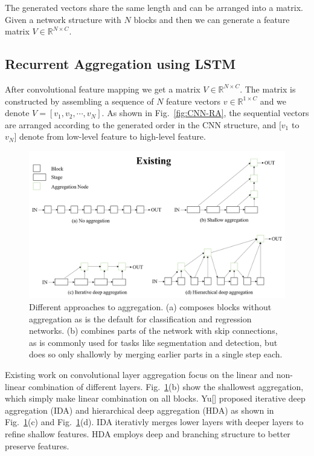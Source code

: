 \documentclass[runningheads]{llncs}
\begin{document}
The generated vectors share the same length and can be arranged into a matrix. Given a network structure with $N$ blocks and then we can generate a feature matrix $V\in \mathbb{R}^{N\times C}$.

\subsection{Recurrent Aggregation using LSTM}
After convolutional feature mapping we get a matrix $V\in \mathbb{R}^{N\times C}$. The matrix is constructed by assembling a sequence of $N$ feature vectors $v \in \mathbb{R}^{1\times C}$ and we denote $V=[v_1, v_2, \cdots, v_N]$. As shown in Fig.~\ref{fig:CNN-RA}, the sequential vectors are arranged according to the generated order in the CNN structure, and $[v_1$ to $v_N]$ denote from low-level feature to high-level feature. 
\begin{figure}  
	\centering
	\includegraphics[width=12cm]{Figures/existed_aggr.png}
	\caption{Different approaches to aggregation. (a) composes blocks without aggregation as is the default for classification and regression networks. (b) combines parts of the network with skip connections, as is commonly used for tasks like segmentation and detection, but does so only shallowly by merging earlier parts in a single step each. }
	\label{fig:exited_aggr}
\end{figure}
Existing work on convolutional layer aggregation focus on the linear and non-linear combination of different layers. Fig.~\ref{fig:exited_aggr}(b) show the shallowest aggregation, which simply make linear combination on all blocks. Yu[] proposed iterative deep aggregation (IDA) and hierarchical deep aggregation (HDA) as shown in Fig.~\ref{fig:exited_aggr}(c) and Fig.~\ref{fig:exited_aggr}(d).  IDA iterativly merges lower layers with deeper layers to refine shallow features. HDA employs deep and branching structure to better preserve features.
\end{document}
